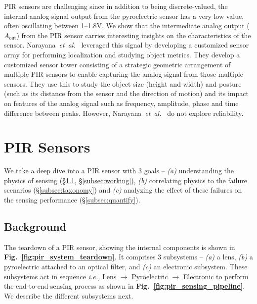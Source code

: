 \documentclass[manuscript]{acmart}
\newcommand{\etal}{{\it et~al.}\xspace}
\newcommand{\ie}{{\it i.e.,}\xspace}
\newcommand{\ca}{{\it (a) }}
\newcommand{\cb}{{\it (b) }}
\newcommand{\cc}{{\it (c) }}
\newcommand{\aout}{$A_{\text{out}}$\xspace}
\begin{document}
PIR sensors are challenging since in addition to being discrete-valued, the internal analog signal output from the pyroelectric sensor has a very low value, often oscillating between 1--1.8V. We show that the intermediate analog output (\aout) from the PIR sensor carries interesting insights on the characteristics of the sensor. Narayana~\etal~\cite{narayana2015pir} leveraged this signal by developing a customized sensor array for performing localization and studying object metrics. They develop a customized sensor tower consisting of a strategic geometric arrangement of multiple PIR sensors to enable capturing the analog signal from those multiple sensors. They use this to study the object size (height and width) and posture (such as its distance from the sensor and the direction of motion) and its impact on features of the analog signal such as frequency, amplitude, phase and time difference between peaks. 
However, Narayana~\etal~\cite{narayana2015pir} do not explore reliability.












 
\section{PIR Sensors}
\label{sec:approach}
We take a deep dive into a PIR sensor with 3 goals -- \ca understanding the physics of sensing (\S\ref{subsec:physics}, \S\ref{subsec:working}), \cb correlating physics to the failure scenarios (\S\ref{subsec:taxonomy}) and \cc analyzing the effect of these failures on the sensing performance (\S\ref{subsec:quantify}).


\subsection{Background}
\label{subsec:physics}
The teardown of a PIR sensor, showing the internal components is shown in {\bfseries Fig.~\ref{fig:pir_system_teardown}}.
It comprises 3 subsystems -- \ca a lens, \cb a pyroelectric attached to an optical filter, and \cc an electronic subsystem.
These subsystems act in sequence \ie Lens $\rightarrow$ Pyroelectric $\rightarrow$ Electronic to perform the end-to-end sensing process as shown in {\bfseries Fig.~\ref{fig:pir_sensing_pipeline}}. We describe the different subsystems next.
\end{document}
